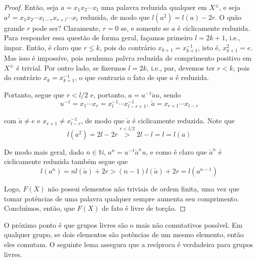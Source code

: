 \documentclass[a4paper,portuguese,11pt,twoside, leqno]{book}
\theoremstyle{definition}
\begin{document}
	\begin{proof} Então, seja $a = x_1x_2\cdots x_l$ uma palavra reduzida qualquer em $X^{\pm}$, e seja $a^2 = x_1x_2\cdots x_{l-r}x_{r+l}\cdots x_l$ reduzida, de modo que $l(a^2) = l(a) - 2r$. O quão grande $r$ pode ser? Claramente, $r=0$ se, e somente se $a$ é ciclicamente reduzida. Para responder essa questão de forma geral, façamos primeiro $l = 2k + 1$, i.e., ímpar. Então, é claro que $r\leq k$, pois do contrário $x_{k+1} = x_{k+1}^{-1}$, isto é, $x_{k+1}^2 = e$. Mas isso é impossíve, pois  nenhuma palvra reduzida de comprimento positivo em $X^{\pm}$ é trivial. Por outro lado, se fizermos $l = 2k$, i.e., par, devemos ter $r<k$, pois do contrário $x_k = x_{k+1}^{-1}$, o que contraria o fato de que $a$ é reduzida. 
		\par\vspace{0.3cm} Portanto, segue que $r< l/2$ e, portanto, $a = u^{-1}\check{a}u$, sendo
		\begin{equation*}
		u^{-1} = x_1\cdots x_r = x_l^{-1}\cdots x_{l-r+1}^{-1}, \ \check{a} = x_{r+1}\cdots x_{l-r}
		\end{equation*}
		\par\vspace{0.3cm} com $\check{a}\neq e$ e $x_{r+1}\neq x_{l-r}^{-1}$, de modo que $\check{a}$ é ciclicamente reduzida. Note que 
		\begin{equation*}
		l(a^2) = 2l - 2r \stackrel{r<l/2}{>} 2l - l = l = l(a)
		\end{equation*}
		\par\vspace{0.3cm} De modo mais geral, dado $n\in\mathbb{N}$, $a^n = u^{-1}\check{a}^nu$, e como é claro que $\check{a}^n$ é ciclicamente reduzida também segue que 
		\begin{equation}
		\label{comprimento de a^n}
		l(a^n) = nl(\check{a}) + 2r > (n-1)l(\check{a}) + 2r = l(a^{n-1})
		\end{equation}
		\par\vspace{0.3cm} Logo, $F(X)$ não possui elementos não triviais de ordem finita, uma vez que tomar potências de uma palavra qualquer sempre aumenta seu comprimento. Concluímos, então, que $F(X)$ de fato é livre de torção.
	\end{proof}
	\par\vspace{0.3cm} O próximo ponto é que grupos livres são o mais não comutativos possível. Em qualquer grupo, se dois elementos são potências de um mesmo elemento, então eles comutam. O seguinte lema assegura que a recíproca é verdadeira para grupos livres.
\end{document}

